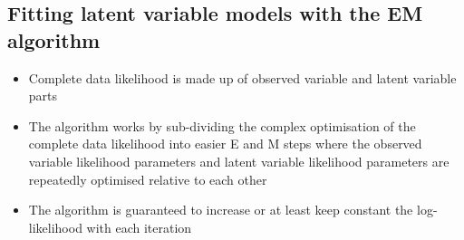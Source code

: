 \documentclass{amsart}
\begin{document}
\subsection{Fitting latent variable models with the EM algorithm}
\begin{itemize}
\item Complete data likelihood is made up of observed variable and latent variable parts
\item The algorithm works by sub-dividing the complex optimisation of the complete data
likelihood into easier E and M steps where the observed variable likelihood parameters 
and latent variable likelihood parameters are repeatedly optimised relative to each 
other
\item The algorithm is guaranteed to increase or at least keep constant the log-
likelihood with each iteration
\end{itemize}
\end{document}
